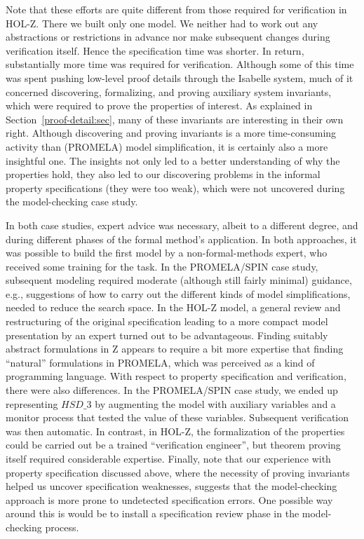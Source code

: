 \documentclass[a4paper,pdftex]{article}
\begin{document}
Note that these efforts are quite different from those required for
verification in HOL-Z.  There we built only one model.  We neither had
to work out any abstractions or restrictions in advance nor make
subsequent changes during verification itself.  Hence the specification
time was shorter.  In return, substantially more time was required for
verification.  Although some of this time was spent pushing low-level
proof details through the Isabelle system, much of it concerned
discovering, formalizing, and proving auxiliary system invariants, which
were required to prove the properties of interest.  As explained in
Section~\ref{proof-detail:sec}, many of these invariants are interesting
in their own right.  Although discovering and proving invariants is a
more time-consuming activity than (PROMELA) model simplification, it is
certainly also a more insightful one.  The insights not only led to a
better understanding of why the properties hold, they also led to our
discovering problems in the informal property specifications (they were
too weak), which were not uncovered during the model-checking case
study.
 
In both case studies, expert advice was necessary, albeit to a different
degree, and during different phases of the formal method's application.
In both approaches, it was possible to build the first model by a
non-formal-methods expert, who received some training for the task. In
the PROMELA/SPIN case study, subsequent modeling required moderate
(although still fairly minimal) guidance, e.g., suggestions of how to
carry out the different kinds of model simplifications, needed to reduce
the search space. In the HOL-Z model, a general review and restructuring
of the original specification leading to a more compact model
presentation by an expert turned out to be advantageous.  Finding
suitably abstract formulations in Z appears to require a bit more
expertise that finding ``natural'' formulations in PROMELA, which was
perceived as a kind of programming language.  With respect to property
specification and verification, there were also differences.  In the
PROMELA/SPIN case study, we ended up representing $HSD\_3$ by augmenting
the model with auxiliary variables and a monitor process that tested the
value of these variables. Subsequent verification was then automatic.
In contrast, in HOL-Z, the formalization of the properties could be
carried out be a trained ``verification engineer'', but theorem proving
itself required considerable expertise.  Finally, note that our
experience with property specification discussed above, where the
necessity of proving invariants helped us uncover specification
weaknesses, suggests that the model-checking approach is more prone to
undetected specification errors.  One possible way around this is would
be to install a specification review phase in the model-checking process.
\end{document}
